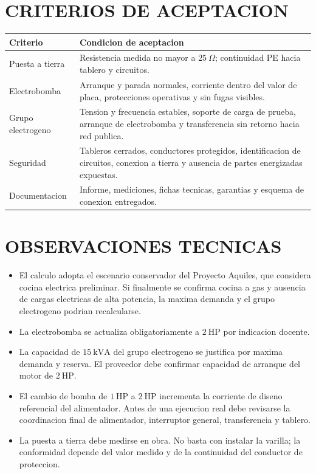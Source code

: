 \documentclass[12pt,letterpaper]{report}
\newcommand{\reqheader}{\rowcolor{modelblue!14}}
\begin{document}
\section{CRITERIOS DE ACEPTACION}

\begin{table}[H]
\centering
\renewcommand{\arraystretch}{1.18}
\begin{tabularx}{\textwidth}{P{0.25\textwidth} L}
\toprule
\reqheader \textbf{Criterio} & \textbf{Condicion de aceptacion} \\
\midrule
Puesta a tierra & Resistencia medida no mayor a \(25\ \Omega\); continuidad PE hacia tablero y circuitos. \\
Electrobomba & Arranque y parada normales, corriente dentro del valor de placa, protecciones operativas y sin fugas visibles. \\
Grupo electrogeno & Tension y frecuencia estables, soporte de carga de prueba, arranque de electrobomba y transferencia sin retorno hacia red publica. \\
Seguridad & Tableros cerrados, conductores protegidos, identificacion de circuitos, conexion a tierra y ausencia de partes energizadas expuestas. \\
Documentacion & Informe, mediciones, fichas tecnicas, garantias y esquema de conexion entregados. \\
\bottomrule
\end{tabularx}
\end{table}

\section{OBSERVACIONES TECNICAS}

\begin{itemize}
  \item El calculo adopta el escenario conservador del Proyecto Aquiles, que considera cocina electrica preliminar. Si finalmente se confirma cocina a gas y ausencia de cargas electricas de alta potencia, la maxima demanda y el grupo electrogeno podrian recalcularse.
  \item La electrobomba se actualiza obligatoriamente a \(2\ \text{HP}\) por indicacion docente.
  \item La capacidad de \(15\ \text{kVA}\) del grupo electrogeno se justifica por maxima demanda y reserva. El proveedor debe confirmar capacidad de arranque del motor de \(2\ \text{HP}\).
  \item El cambio de bomba de \(1\ \text{HP}\) a \(2\ \text{HP}\) incrementa la corriente de diseno referencial del alimentador. Antes de una ejecucion real debe revisarse la coordinacion final de alimentador, interruptor general, transferencia y tablero.
  \item La puesta a tierra debe medirse en obra. No basta con instalar la varilla; la conformidad depende del valor medido y de la continuidad del conductor de proteccion.
\end{itemize}
\end{document}
